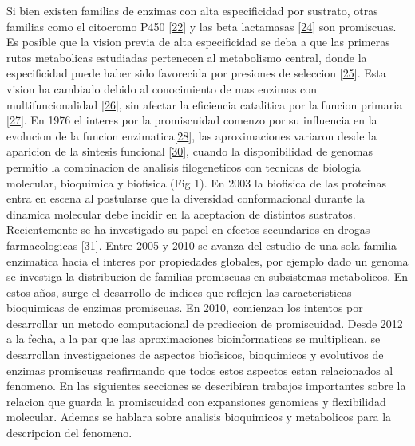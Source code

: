 \documentclass[12pt,twoside]{reedthesis}
\begin{document}
  Si bien existen familias de enzimas con alta especificidad por sustrato,
  otras familias como el citocromo P450
  {[}\protect\hyperlink{ref-bloom_neutral_2007}{22}{]} y las beta
  lactamasas {[}\protect\hyperlink{ref-zou_evolution_2015}{24}{]} son
  promiscuas. Es posible que la vision previa de alta especificidad se
  deba a que las primeras rutas metabolicas estudiadas pertenecen al
  metabolismo central, donde la especificidad puede haber sido favorecida
  por presiones de seleccion
  {[}\protect\hyperlink{ref-firn_darwinian_2009}{25}{]}. Esta vision ha
  cambiado debido al conocimiento de mas enzimas con multifuncionalidad
  {[}\protect\hyperlink{ref-jia_multifunctional_2013}{26}{]}, sin afectar
  la eficiencia catalitica por la funcion primaria
  {[}\protect\hyperlink{ref-aharoni_evolvability_2005}{27}{]}. En 1976 el
  interes por la promiscuidad comenzo por su influencia en la evolucion de
  la funcion
  enzimatica{[}\protect\hyperlink{ref-jensen_enzyme_1976}{28}{]}, las
  aproximaciones variaron desde la aparicion de la sintesis funcional
  {[}\protect\hyperlink{ref-dean_mechanistic_2007}{30}{]}, cuando la
  disponibilidad de genomas permitio la combinacion de analisis
  filogeneticos con tecnicas de biologia molecular, bioquimica y biofisica
  (Fig 1). En 2003 la biofisica de las proteinas entra en escena al
  postularse que la diversidad conformacional durante la dinamica
  molecular debe incidir en la aceptacion de distintos sustratos.
  Recientemente se ha investigado su papel en efectos secundarios en
  drogas farmacologicas
  {[}\protect\hyperlink{ref-nobeli_protein_2009}{31}{]}. Entre 2005 y 2010
  se avanza del estudio de una sola familia enzimatica hacia el interes
  por propiedades globales, por ejemplo dado un genoma se investiga la
  distribucion de familias promiscuas en subsistemas metabolicos. En estos
  años, surge el desarrollo de indices que reflejen las caracteristicas
  bioquimicas de enzimas promiscuas. En 2010, comienzan los intentos por
  desarrollar un metodo computacional de prediccion de promiscuidad. Desde
  2012 a la fecha, a la par que las aproximaciones bioinformaticas se
  multiplican, se desarrollan investigaciones de aspectos biofisicos,
  bioquimicos y evolutivos de enzimas promiscuas reafirmando que todos
  estos aspectos estan relacionados al fenomeno. En las siguientes
  secciones se describiran trabajos importantes sobre la relacion que
  guarda la promiscuidad con expansiones genomicas y flexibilidad
  molecular. Ademas se hablara sobre analisis bioquimicos y metabolicos
  para la descripcion del fenomeno.
  
\end{document}
